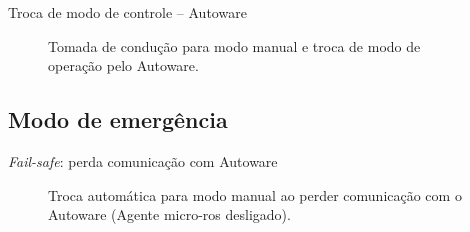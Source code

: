 \documentclass{if-beamer}
\begin{document}
\begin{frame}{Troca de modo de controle -- Autoware}
	
	\begin{figure}[H]
		\centering
		\caption{Tomada de condução para modo manual e troca de modo de operação pelo Autoware.}
		\label{fig:microautoware_testing_autonomous_w_manual_mode_take_up}
	\end{figure}
\end{frame}

\subsection*{Modo de emergência}

\begin{frame}{\textit{Fail-safe}: perda comunicação com Autoware}
	
	\begin{figure}[H]
		\centering
		\caption{Troca automática para modo manual ao perder comunicação com o Autoware (Agente micro-ros desligado).}
		\label{fig:microautoware_lost_autoware}
	\end{figure}

\end{frame}
\end{document}
